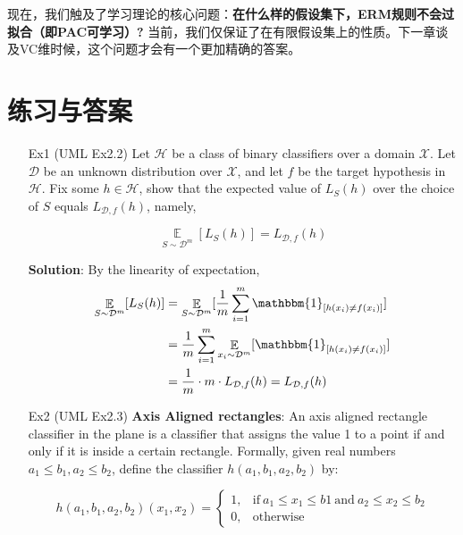 \documentclass{article}
\begin{document}
	现在，我们触及了学习理论的核心问题：\textbf{在什么样的假设集下，ERM规则不会过拟合（即PAC可学习）?} 当前，我们仅保证了在有限假设集上的性质。下一章谈及VC维时候，这个问题才会有一个更加精确的答案。

\section{练习与答案}

\begin{itemize}
\item[Ex1] (UML Ex2.2) Let $\mathcal{H}$ be a class of binary classifiers over a domain $\mathcal{X}$. Let $\mathcal{D}$ be an unknown distribution over $\mathcal{X}$, and let $f$ be the target hypothesis in $\mathcal{H}$. Fix some $h\in\mathcal{H}$, show that the expected value of $L_S(h)$ over the choice of $S$ equals $L_{\mathcal{D},f}(h)$, namely,

\begin{equation*}
\mathop\mathbb{E}\limits_{S\sim\mathcal{D}^m}[L_S(h)]=L_{\mathcal{D},f}(h)
\end{equation*}

\item[] \textbf{Solution}: By the linearity of expectation,
\begin{equation*}
\begin{split}
\mathop\mathbb{E}\limits_{S\sim\mathcal{D}^m}[L_S(h)] 
&= \mathop\mathbb{E}\limits_{S\sim\mathcal{D}^m}[\frac{1}{m}\sum_{i=1}^m \mathbbm{1}_{[h(x_i)\neq f(x_i)]}] \\
&= \frac{1}{m}\sum_{i=1}^m \mathop\mathbb{E}\limits_{x_i \sim\mathcal{D}^m}[\mathbbm{1}_{[h(x_i)\neq f(x_i)]}] \\
&= \frac{1}{m} \cdot m \cdot L_{\mathcal{D},f}(h) = L_{\mathcal{D},f}(h)
\end{split}
\end{equation*}

\item[Ex2] (UML Ex2.3) \textbf{Axis Aligned rectangles}: An axis aligned rectangle classifier in the plane is a classifier that assigns the value 1 to a point if and only if it is inside a certain rectangle. Formally, given real numbers $a_1\leq b_1,a_2\leq b_2$, define the classifier $h(a_1,b_1,a_2,b_2)$ by:

	\begin{equation*}
	h(a_1,b_1,a_2,b_2)(x_1, x_2) = \left\{\begin{matrix}
	1,& \mathrm{if}\ a_1 \leq x_1 \leq b1\ \mathrm{and}\  a_2 \leq x_2 \leq b_2 \\
	0,& \mathrm{otherwise}
	\end{matrix}\right.
	\end{equation*}


\end{itemize}
\end{document}
